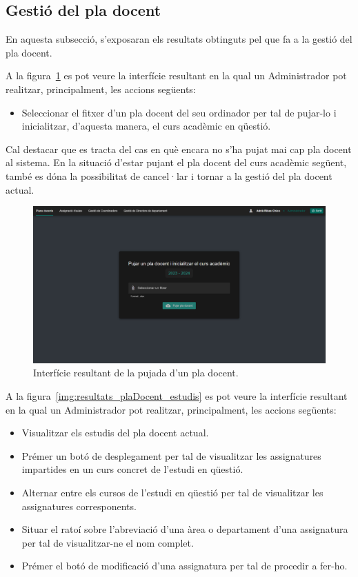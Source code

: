 \documentclass[a4paper,12pt]{ThesisStyle}
\begin{document}
\newpage

\subsection{Gestió del pla docent}
\label{subsec:resultats_plaDocent}

En aquesta subsecció, s'exposaran els resultats obtinguts pel que fa a la gestió del pla docent.

A la figura~\ref{img:resultats_plaDocent_pujada} es pot veure la interfície resultant en la qual un Administrador pot realitzar, principalment, les accions següents:
\begin{itemize}
  \item Seleccionar el fitxer d'un pla docent del seu ordinador per tal de pujar-lo i inicialitzar, d'aquesta manera, el curs acadèmic en qüestió.
\end{itemize}

Cal destacar que es tracta del cas en què encara no s'ha pujat mai cap pla docent al sistema. En la situació d'estar pujant el pla docent del curs acadèmic següent, també es dóna la possibilitat de cancel·lar i tornar a la gestió del pla docent actual.

\begin{figure}[H]
  \centering
  \includegraphics[width=\textwidth]{assets/results/plaDocent/pujada.png}
  \caption{\label{img:resultats_plaDocent_pujada}Interfície resultant de la pujada d'un pla docent.}
\end{figure}

\newpage

A la figura~\ref{img:resultats_plaDocent_estudis} es pot veure la interfície resultant en la qual un Administrador pot realitzar, principalment, les accions següents:
\begin{itemize}
  \item Visualitzar els estudis del pla docent actual.
  \item Prémer un botó de desplegament per tal de visualitzar les assignatures impartides en un curs concret de l'estudi en qüestió.
  \item Alternar entre els cursos de l'estudi en qüestió per tal de visualitzar les assignatures corresponents.
  \item Situar el ratoí sobre l'abreviació d'una àrea o departament d'una assignatura per tal de visualitzar-ne el nom complet.
  \item Prémer el botó de modificació d'una assignatura per tal de procedir a fer-ho.
\end{itemize}
\end{document}
